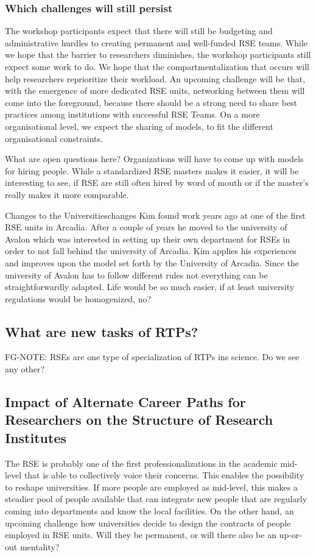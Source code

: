 \documentclass{eceasst}
\begin{document}
\subsubsection{Which challenges will still persist}
The workshop participants expect that there will still be budgeting and administrative hurdles to creating
permanent and well-funded RSE teams.
While we hope that the barrier to researchers diminishes, the workshop participants
still expect some work to do. We hope that the compartmentalization that occurs will help researchers reprioritize their workload.
An upcoming challenge will be that, with the emergence of more dedicated RSE units,
networking between them will come into the foreground, because there should be a strong need to share best practices
among institutions with successful RSE Teams.
On a more organisational level, we expect the sharing of models, to fit the different organisational constraints.

What are open questions here?
Organizations will have to come up with models for hiring people. While
a standardized RSE masters makes it easier, it will be interesting to see, if
RSE are still often hired by word of mouth or if the master's really makes it more comparable.

\begin{story}{Changes to the Universities}{changes}
Kim found work years ago at one of the first RSE units in Arcadia. After a couple of years he moved to the university of
Avalon which was interested in setting up their own department for RSEs in order to not fall behind the university of Arcadia.
Kim applies his experiences and improves upon the model set forth by the University of Arcadia. Since the university
of Avalon has to follow different rules not everything can be straightforwardly adapted. Life would be so much easier,
if at least university regulations would be homogenized, no?
\end{story}

\subsection{What are new tasks of RTPs?}
 FG-NOTE: RSEs are one type of specialization of RTPs ins science. Do we see any other?

\subsection{Impact of Alternate Career Paths for Researchers on the Structure of Research Institutes}
The RSE is probably one of the first professionalizations in the academic mid-level that is able
to collectively voice their concerns. This enables the possibility to reshape universities.
If more people are employed as mid-level, this makes a steadier pool of people
available that can integrate new people that are regularly coming into departments and know the local facilities.
On the other hand, an upcoming challenge how universities decide to design the contracts of people employed
in RSE units. Will they be permanent, or will there also be an up-or-out mentality?
\end{document}
